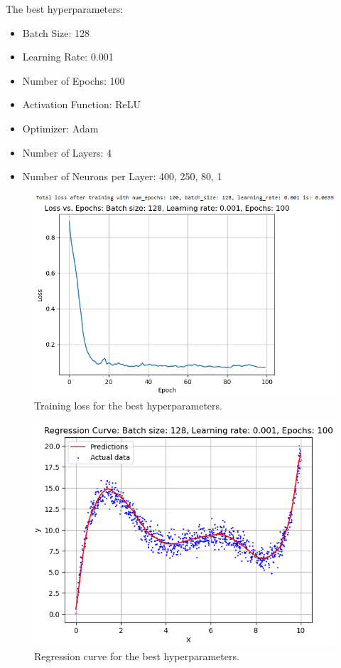 \documentclass[12pt]{article}
\begin{document}
\noindent The best hyperparameters:
\begin{itemize}
    \item Batch Size: 128
    \item Learning Rate: 0.001
    \item Number of Epochs: 100
    \item Activation Function: ReLU
    \item Optimizer: Adam
    \item Number of Layers: 4
    \item Number of Neurons per Layer: 400, 250, 80, 1
\end{itemize}

\newpage

\begin{figure}[ht]
    \centering
    \includegraphics[width=0.9\linewidth]{BestLoss.PNG}
    \caption{Training loss for the best hyperparameters.}
\end{figure}

\newpage

\begin{figure}[ht]
    \centering
    \includegraphics[width=0.9\linewidth]{BestRegressionCurve.PNG}
    \caption{Regression curve for the best hyperparameters.}
\end{figure}
\end{document}

